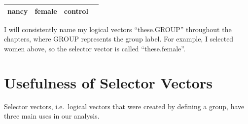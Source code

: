 \documentclass[]{book}
\newenvironment{Shaded}{\begin{snugshade}}{\end{snugshade}}
\newcommand{\CommentTok}[1]{\textcolor[rgb]{0.56,0.35,0.01}{\textit{#1}}}
\newcommand{\KeywordTok}[1]{\textcolor[rgb]{0.13,0.29,0.53}{\textbf{#1}}}
\newcommand{\NormalTok}[1]{#1}
\newcommand{\OperatorTok}[1]{\textcolor[rgb]{0.81,0.36,0.00}{\textbf{#1}}}
\newcommand{\StringTok}[1]{\textcolor[rgb]{0.31,0.60,0.02}{#1}}
\theoremstyle{definition}
\theoremstyle{definition}
\theoremstyle{definition}
\theoremstyle{remark}
\begin{document}
\begin{longtable}[]{@{}cccc@{}}
\begin{minipage}[t]{0.11\columnwidth}\centering
nancy\strut
\end{minipage} & \begin{minipage}[t]{0.11\columnwidth}\centering
female\strut
\end{minipage} & \begin{minipage}[t]{0.12\columnwidth}\centering
control\strut
\end{minipage} & \begin{minipage}[t]{0.14\columnwidth}\centering
58\strut
\end{minipage}\tabularnewline
\bottomrule
\end{longtable}

\begin{Shaded}
\end{Shaded}

I will consistently name my logical vectors ``these.GROUP'' throughout
the chapters, where GROUP represents the group label. For example, I
selected women above, so the selector vector is called ``these.female''.

\hypertarget{usefulness-of-selector-vectors}{%
\section{Usefulness of Selector
Vectors}\label{usefulness-of-selector-vectors}}

Selector vectors, i.e.~logical vectors that were created by defining a
group, have three main uses in our analysis.
\end{document}
